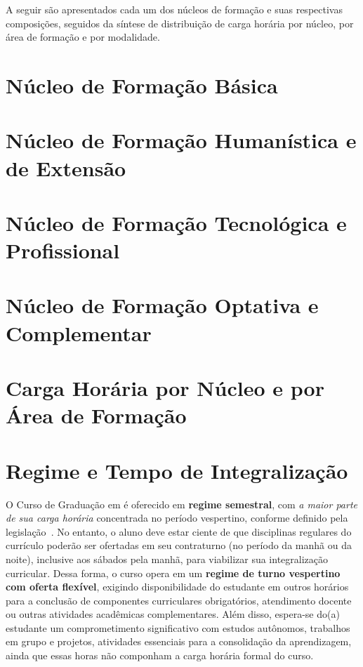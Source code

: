 A seguir são apresentados cada um dos núcleos de formação e suas respectivas composições, seguidos da síntese de distribuição de carga horária por núcleo, por área de formação e por modalidade.

\section{Núcleo de Formação Básica}


\section{Núcleo de Formação Humanística e de Extensão}


\section{Núcleo de Formação Tecnológica e Profissional}


\section{Núcleo de Formação Optativa e Complementar}


\section{Carga Horária por Núcleo e por Área de Formação}




\section{Regime e Tempo de Integralização}
\label{sec:regime}

O Curso de Graduação em \ppccurso é oferecido em \textbf{regime semestral}, com \textit{a maior parte de sua carga horária} concentrada no período vespertino, conforme definido pela legislação~\cite{MEC:Portaria:21:2017}. No entanto, o aluno deve estar ciente de que disciplinas regulares do currículo poderão ser ofertadas em seu contraturno (no período da manhã ou da noite), inclusive aos sábados pela manhã, para viabilizar sua integralização curricular. Dessa forma, o curso opera em um \textbf{regime de turno vespertino com oferta flexível}, exigindo disponibilidade do estudante em outros horários para a conclusão de componentes curriculares obrigatórios, atendimento docente ou outras atividades acadêmicas complementares. Além disso, espera-se do(a) estudante um comprometimento significativo com estudos autônomos, trabalhos em grupo e projetos, atividades essenciais para a consolidação da aprendizagem, ainda que essas horas não componham a carga horária formal do curso.

